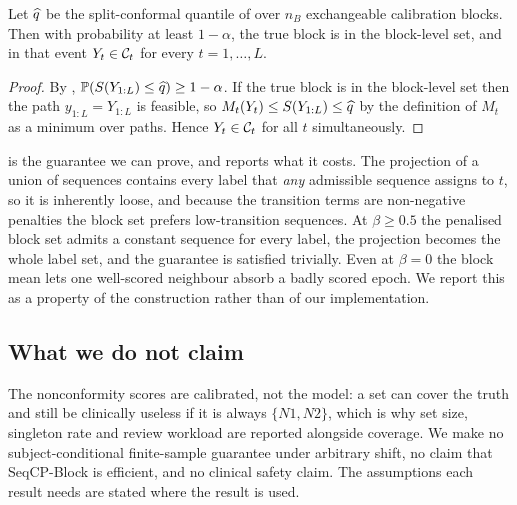 \begin{theorem}
\label{thm:projection}
Let $\widehat{q}$ be the split-conformal quantile of  over
$n_B$ exchangeable calibration blocks. Then with probability at least
$1-\alpha$, the true block is in the block-level set, and in that
event $Y_t\in\mathcal{C}_t$ for every $t=1,\dots,L$.
\end{theorem}

\begin{proof}
By , $\mathbb{P}(S(Y_{1:L})\le\widehat{q})\ge 1-\alpha$. If the true
block is in the block-level set then the path $y_{1:L}=Y_{1:L}$ is feasible,
so $M_t(Y_t)\le S(Y_{1:L})\le\widehat{q}$ by the definition of $M_t$ as a minimum
over paths. Hence $Y_t\in\mathcal{C}_t$ for all $t$ simultaneously.
\end{proof}

 is the guarantee we can prove, and
 reports what it costs. The projection of a union
of sequences contains every label that \emph{any} admissible sequence assigns
to $t$, so it is inherently loose, and because the transition terms are
non-negative penalties the block set prefers low-transition sequences. At
$\beta\ge0.5$ the penalised block set admits a constant sequence for every
label, the projection becomes the whole label set, and the guarantee is
satisfied trivially. Even at $\beta=0$ the block mean lets one well-scored
neighbour absorb a badly scored epoch. We report this as a property of the
construction rather than of our implementation.

\subsection{What we do not claim}
\label{sec:method-claims}

The nonconformity scores are calibrated, not the model: a set can cover the
truth and still be clinically useless if it is always $\{N1,N2\}$, which is
why set size, singleton rate and review workload are reported alongside
coverage. We make no subject-conditional finite-sample guarantee under
arbitrary shift, no claim that SeqCP-Block is efficient, and no clinical
safety claim. The assumptions each result needs are stated where the result
is used.
